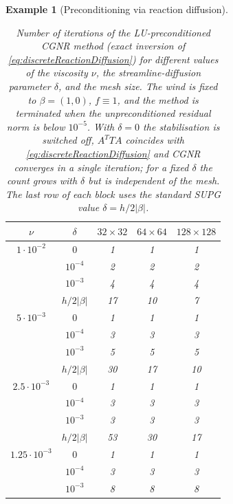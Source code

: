 \documentclass[hidelinks,onefignum,onetabnum]{siamart220329}
\newcommand{\bb}[1]{#1}
\newtheorem{example}{Example}
\begin{document}
\begin{example}[Preconditioning via reaction diffusion]
        \begin{table}
        \centering
%
	\caption{\bb{Number of iterations of the LU-preconditioned CGNR method (exact inversion of \eqref{eq:discreteReactionDiffusion}) for different values of the viscosity $\nu$, the streamline-diffusion parameter $\delta$, and the mesh size. The wind is fixed to $\beta = (1,0)$, $f \equiv 1$, and the method is terminated when the unpreconditioned residual norm is below $10^{-5}$. With $\delta = 0$ the stabilisation is switched off, $A^T T A$ coincides with \eqref{eq:discreteReactionDiffusion} and CGNR converges in a single iteration; for a fixed $\delta$ the count grows with $\delta$ but is independent of the mesh. The last row of each block uses the standard SUPG value $\delta = h/2|\beta|$.}}
        \label{tab:reactionDiffusionLU}
        \begin{tabular}{c|c|c|c|c}
            \toprule
            $\nu$ & $\delta$ & $32\times 32$ & $64\times 64$ & $128\times 128$ \\
            \midrule
            $1\cdot 10^{-2}$    & $0$          & 1 & 1 & 1 \\
                                & $10^{-4}$    & 2 & 2 & 2 \\
                                & $10^{-3}$    & 4 & 4 & 4 \\
                                & $h/2|\beta|$ & 17 & 10 & 7 \\
            \midrule
            $5\cdot 10^{-3}$    & $0$          & 1 & 1 & 1 \\
                                & $10^{-4}$    & 3 & 3 & 3 \\
                                & $10^{-3}$    & 5 & 5 & 5 \\
                                & $h/2|\beta|$ & 30 & 17 & 10 \\
            \midrule
            $2.5\cdot 10^{-3}$  & $0$          & 1 & 1 & 1 \\
                                & $10^{-4}$    & 3 & 3 & 3 \\
                                & $10^{-3}$    & 3 & 3 & 3 \\
                                & $h/2|\beta|$ & 53 & 30 & 17 \\
            \midrule
            $1.25\cdot 10^{-3}$ & $0$          & 1 & 1 & 1 \\
                                & $10^{-4}$    & 3 & 3 & 3 \\
                                & $10^{-3}$    & 8 & 8 & 8 \\

\end{tabular}
\end{table}
\end{example}
\end{document}
